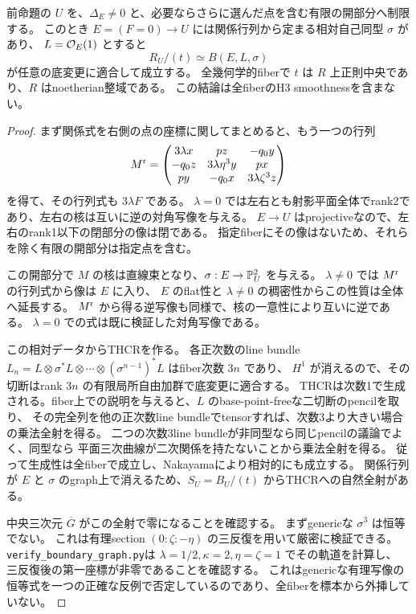 \begin{theorem}[相対THCR境界と全fiberの整域性]\label{thm:relative-THCR-boundary}
前命題の $U$ を、$\Delta_E\ne0$ と、必要ならさらに選んだ点を含む有限の開部分へ制限する。
このとき $E=(F=0)\to U$ には関係行列から定まる相対自己同型 $\sigma$ があり、
$L=\mathcal O_E(1)$ とすると
\[
 R_U/(t)\simeq B(E,L,\sigma)
\]
が任意の底変更に適合して成立する。
全幾何学的fiberで $t$ は $R$ 上正則中央であり、$R$ はnoetherian整域である。
この結論は全fiberのH3 smoothnessを含まない。
\end{theorem}
\begin{proof}
まず関係式を右側の点の座標に関してまとめると、もう一つの行列
\[
 M^{\rm r}=\begin{pmatrix}
 3\lambda x&pz&-q_0y\\
 -q_0z&3\lambda\eta^3y&px\\
 py&-q_0x&3\lambda\zeta^3z
 \end{pmatrix}
\]
を得て、その行列式も $3\lambda F$ である。
$\lambda=0$ では左右とも射影平面全体でrank2であり、左右の核は互いに逆の対角写像を与える。
$E\to U$ はprojectiveなので、左右のrank1以下の閉部分の像は閉である。
指定fiberにその像はないため、それらを除く有限の開部分は指定点を含む。

この開部分で $M$ の核は直線束となり、$\sigma:E\to\mathbb P^2_U$ を与える。
$\lambda\ne0$ では $M^{\rm r}$ の行列式から像は $E$ に入り、
$E$ のflat性と $\lambda\ne0$ の稠密性からこの性質は全体へ延長する。
$M^{\rm r}$ から得る逆写像も同様で、核の一意性により互いに逆である。
$\lambda=0$ での式は既に検証した対角写像である。

この相対データからTHCRを作る。
各正次数のline bundle $L_n=L\otimes\sigma^*L\otimes\cdots\otimes(\sigma^{n-1})^*L$ はfiber次数 $3n$ であり、
$H^1$ が消えるので、その切断はrank $3n$ の有限局所自由加群で底変更に適合する。
THCRは次数1で生成される。fiber上での説明を与えると、$L$ のbase-point-freeな二切断のpencilを取り、
その完全列を他の正次数line bundleでtensorすれば、次数3より大きい場合の乗法全射を得る。
二つの次数3line bundleが非同型なら同じpencilの議論でよく、同型なら
平面三次曲線が二次関係を持たないことから乗法全射を得る。
従って生成性は全fiberで成立し、Nakayamaにより相対的にも成立する。
関係行列が $E$ と $\sigma$ のgraph上で消えるため、$S_U=B_U/(t)$ からTHCRへの自然全射がある。

中央三次元 $\overline G$ がこの全射で零になることを確認する。
まずgenericな $\sigma^3$ は恒等でない。
これは有理section $(0:\zeta:-\eta)$ の三反復を用いて厳密に検証できる。
\texttt{verify\_boundary\_graph.py}は
$\lambda=1/2,\kappa=2,\eta=\zeta=1$ でその軌道を計算し、
三反復後の第一座標が非零であることを確認する。
これはgenericな有理写像の恒等式を一つの正確な反例で否定しているのであり、全fiberを標本から外挿していない。


\end{proof}
